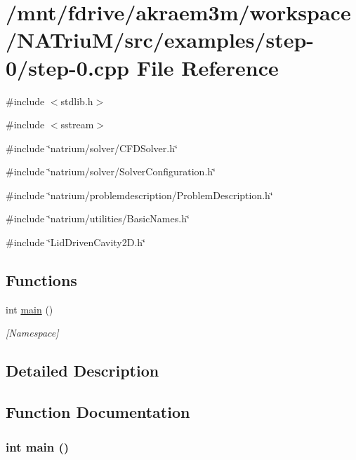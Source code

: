 \hypertarget{step-0_8cpp}{
\section{/mnt/fdrive/akraem3m/workspace/NATriuM/src/examples/step-\/0/step-\/0.cpp File Reference}
\label{step-0_8cpp}
}
{\ttfamily \#include $<$stdlib.h$>$}\par
{\ttfamily \#include $<$sstream$>$}\par
{\ttfamily \#include \char`\"{}natrium/solver/CFDSolver.h\char`\"{}}\par
{\ttfamily \#include \char`\"{}natrium/solver/SolverConfiguration.h\char`\"{}}\par
{\ttfamily \#include \char`\"{}natrium/problemdescription/ProblemDescription.h\char`\"{}}\par
{\ttfamily \#include \char`\"{}natrium/utilities/BasicNames.h\char`\"{}}\par
{\ttfamily \#include \char`\"{}LidDrivenCavity2D.h\char`\"{}}\par
\subsection*{Functions}
\begin{DoxyCompactItemize}
\item 
int \hyperlink{step-0_8cpp_ae66f6b31b5ad750f1fe042a706a4e3d4}{main} ()
\begin{DoxyCompactList}\small\item\em \mbox{[}Namespace\mbox{]} \item\end{DoxyCompactList}\end{DoxyCompactItemize}


\subsection{Detailed Description}


\subsection{Function Documentation}
\hypertarget{step-0_8cpp_ae66f6b31b5ad750f1fe042a706a4e3d4}{
\subsubsection[{main}]{\setlength{\rightskip}{0pt plus 5cm}int main ()}}
\label{step-0_8cpp_ae66f6b31b5ad750f1fe042a706a4e3d4}


